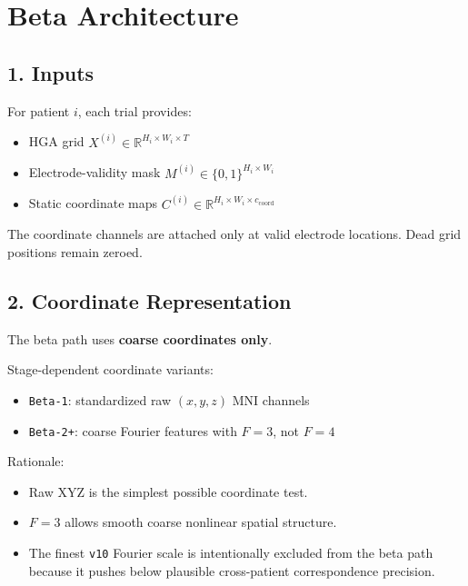 \documentclass[
]{article}
\providecommand{\tightlist}{%
  \setlength{\itemsep}{0pt}\setlength{\parskip}{0pt}}
\begin{document}
\section{Beta Architecture}\label{beta-architecture}

\subsection{1. Inputs}\label{inputs}

For patient \(i\), each trial provides:

\begin{itemize}
\tightlist
\item
  HGA grid \(X^{(i)} \in \mathbb{R}^{H_i \times W_i \times T}\)
\item
  Electrode-validity mask \(M^{(i)} \in \{0,1\}^{H_i \times W_i}\)
\item
  Static coordinate maps
  \(C^{(i)} \in \mathbb{R}^{H_i \times W_i \times c_{\text{coord}}}\)
\end{itemize}

The coordinate channels are attached only at valid electrode locations.
Dead grid positions remain zeroed.

\subsection{2. Coordinate
Representation}\label{coordinate-representation}

The beta path uses \textbf{coarse coordinates only}.

Stage-dependent coordinate variants:

\begin{itemize}
\tightlist
\item
  \texttt{Beta-1}: standardized raw \((x, y, z)\) MNI channels
\item
  \texttt{Beta-2+}: coarse Fourier features with \(F = 3\), not
  \(F = 4\)
\end{itemize}

Rationale:

\begin{itemize}
\tightlist
\item
  Raw XYZ is the simplest possible coordinate test.
\item
  \(F=3\) allows smooth coarse nonlinear spatial structure.
\item
  The finest \texttt{v10} Fourier scale is intentionally excluded from
  the beta path because it pushes below plausible cross-patient
  correspondence precision.
\end{itemize}
\end{document}
